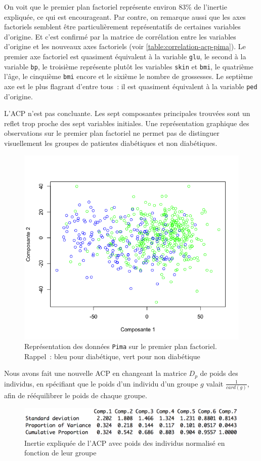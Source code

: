 \documentclass[a4paper,10pt]{report}
\begin{document}
On voit que le premier plan factoriel représente environ 83\% de l'inertie expliquée, ce qui est encourageant.
Par contre, on remarque aussi que les axes factoriels semblent être particulièrement représentatifs de certaines variables d'origine. Et c'est confirmé par la matrice de corrélation entre les variables d'origine et les nouveaux axes factoriels (voir \autoref{table:correlation-acp-pima}). Le premier axe factoriel est quasiment équivalent à la variable \texttt{glu}, le second à la variable \texttt{bp}, le troisième représente plutôt les variables \texttt{skin} et \texttt{bmi}, le quatrième l'âge, le cinquième \texttt{bmi} encore et le sixième le nombre de grossesses. Le septième axe est le plus flagrant d'entre tous~: il est quasiment équivalent à la variable \texttt{ped} d'origine.

L'ACP n'est pas concluante. Les sept composantes principales trouvées sont un reflet trop proche des sept variables initiales. Une représentation graphique des observations sur le premier plan factoriel ne permet pas de distinguer visuellement les groupes de patientes diabétiques et non diabétiques.


\begin{figure}[H]
	\centering
	\captionsetup{justification=centering, margin=2cm}
	\includegraphics[width=.4\linewidth]{img/2-4-Pima-ACP-premier-plan-factoriel}
	\caption{\scriptsize Représentation des données \texttt{Pima} sur le premier plan factoriel.\\ \tiny Rappel~: bleu pour diabétique, vert pour non diabétique}
	\label{fig:2-4-Pima-ACP-premier-plan-factoriel}
\end{figure}


Nous avons fait une nouvelle ACP en changeant la matrice $D_p$ de poids des individus, en spécifiant que le poids d'un individu d'un groupe $g$ valait $\frac{1}{card(g)}$, afin de rééquilibrer le poids de chaque groupe.

\begin{figure}[H]
	\centering
	\captionsetup{justification=centering, margin=2cm}
	\includegraphics[width=.7\linewidth]{img/2-4-Pima-ACP-dp-inertie-expliquee}
	\caption{\scriptsize Inertie expliquée de l'ACP avec poids des individus normalisé en fonction de leur groupe}
	\label{fig:2-4-Pima-ACP-dp-inertie-expliquee}
\end{figure}
\end{document}

